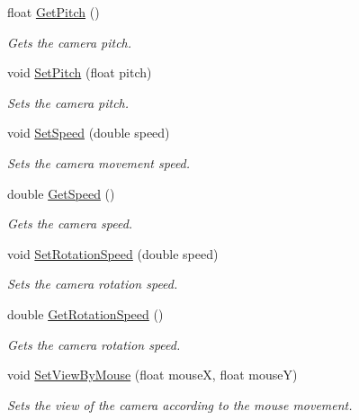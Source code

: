 \begin{CompactItemize}
float \hyperlink{class_camera_498895884e11402ffaf248c32aa31856}{GetPitch} ()
\begin{CompactList}\small\item\em Gets the camera pitch. \item\end{CompactList}\item 
void \hyperlink{class_camera_bd3daba04eb01231eec1d5fdbe862d52}{SetPitch} (float pitch)
\begin{CompactList}\small\item\em Sets the camera pitch. \item\end{CompactList}\item 
void \hyperlink{class_camera_8cb555aeca85fcd988978105178cc0f3}{SetSpeed} (double speed)
\begin{CompactList}\small\item\em Sets the camera movement speed. \item\end{CompactList}\item 
double \hyperlink{class_camera_6d305ab5442a489253a321b2a45b11b6}{GetSpeed} ()
\begin{CompactList}\small\item\em Gets the camera speed. \item\end{CompactList}\item 
void \hyperlink{class_camera_bce25d2360c703fb5ac6da02d3991bda}{SetRotationSpeed} (double speed)
\begin{CompactList}\small\item\em Sets the camera rotation speed. \item\end{CompactList}\item 
double \hyperlink{class_camera_eebe84aaf8b615505ef2ad7f7bbffbb9}{GetRotationSpeed} ()
\begin{CompactList}\small\item\em Gets the camera rotation speed. \item\end{CompactList}\item 
void \hyperlink{class_camera_05c4a137b939bfdee2b7efea6d67d0e7}{SetViewByMouse} (float mouseX, float mouseY)
\begin{CompactList}\small\item\em Sets the view of the camera according to the mouse movement. \item\end{CompactList}\item 

\end{CompactItemize}
